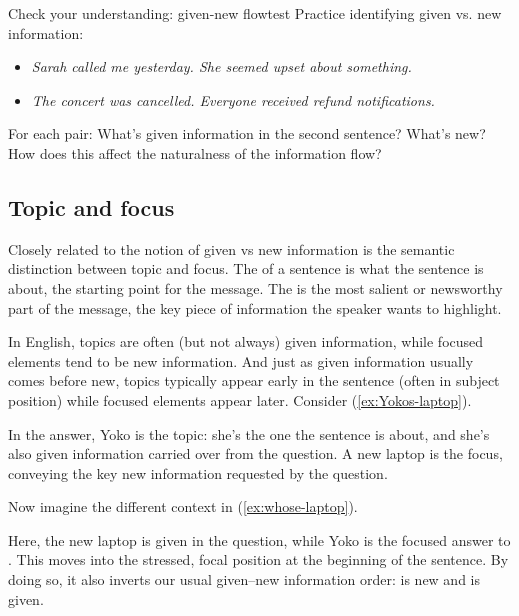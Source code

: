 \begin{tblsframedsymbol}{Check your understanding: given-new flow}{test}
Practice identifying given vs. new information:
\begin{itemize}[noitemsep, leftmargin=*]
    \item \emph{Sarah called me yesterday. She seemed upset about something.}
    \item \emph{The concert was cancelled. Everyone received refund notifications.}
\end{itemize}
For each pair: What's given information in the second sentence? What's new? How does this affect the naturalness of the information flow?
\end{tblsframedsymbol}


\subsection{Topic and focus} \label{sec:topic+focus}

Closely related to the notion of given vs new information is the semantic distinction between topic and focus. The  of a sentence is what the sentence is about, the starting point for the message. The  is the most salient or newsworthy part of the message, the key piece of information the speaker wants to highlight.

In English, topics are often (but not always) given information, while focused elements tend to be new information. And just as given information usually comes before new, topics typically appear early in the sentence (often in subject position) while focused elements appear later. Consider (\ref{ex:Yokos-laptop}).

\label{ex:Yokos-laptop}
\z
In the answer, Yoko is the topic: she's the one the sentence is about, and she's also given information carried over from the question. A new laptop is the focus, conveying the key new information requested by the question.

Now imagine the different context in (\ref{ex:whose-laptop}).

\label{ex:whose-laptop}
\z
Here, the new laptop is given in the question, while Yoko is the focused answer to . This moves  into the stressed, focal position at the beginning of the sentence. By doing so, it also inverts our usual given--new information order:  is new and  is given.

